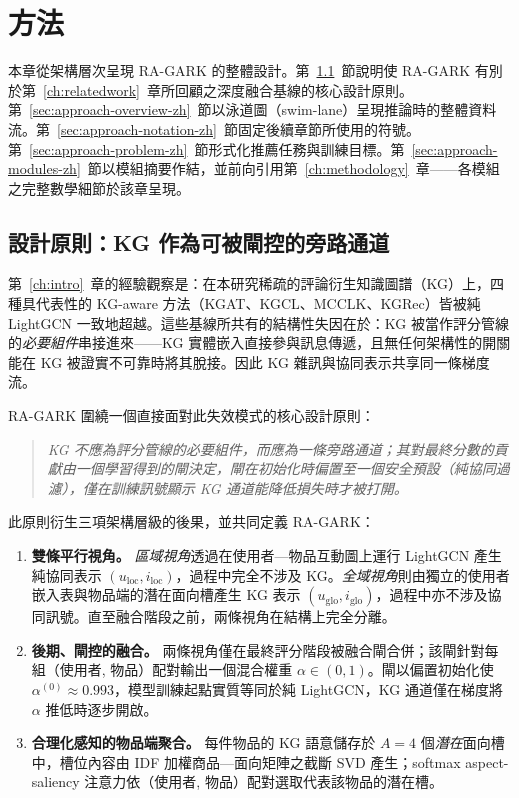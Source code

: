 \chapter{方法}
\label{ch:architecture-zh}

本章從架構層次呈現 RA-GARK 的整體設計。第~\ref{sec:approach-principle-zh}~節說明使 RA-GARK 有別於第~\ref{ch:relatedwork}~章所回顧之深度融合基線的核心設計原則。第~\ref{sec:approach-overview-zh}~節以泳道圖（swim-lane）呈現推論時的整體資料流。第~\ref{sec:approach-notation-zh}~節固定後續章節所使用的符號。第~\ref{sec:approach-problem-zh}~節形式化推薦任務與訓練目標。第~\ref{sec:approach-modules-zh}~節以模組摘要作結，並前向引用第~\ref{ch:methodology}~章——各模組之完整數學細節於該章呈現。

\section{設計原則：KG 作為可被閘控的旁路通道}
\label{sec:approach-principle-zh}

第~\ref{ch:intro}~章的經驗觀察是：在本研究稀疏的評論衍生知識圖譜（KG）上，四種具代表性的 KG-aware 方法（KGAT、KGCL、MCCLK、KGRec）皆被純 LightGCN 一致地超越。這些基線所共有的結構性失因在於：KG 被當作評分管線的\emph{必要組件}串接進來——KG 實體嵌入直接參與訊息傳遞，且無任何架構性的開關能在 KG 被證實不可靠時將其脫接。因此 KG 雜訊與協同表示共享同一條梯度流。

RA-GARK 圍繞一個直接面對此失效模式的核心設計原則：

\begin{quote}
\emph{KG 不應為評分管線的必要組件，而應為一條旁路通道；其對最終分數的貢獻由一個學習得到的閘決定，閘在初始化時偏置至一個安全預設（純協同過濾），僅在訓練訊號顯示 KG 通道能降低損失時才被打開。}
\end{quote}

此原則衍生三項架構層級的後果，並共同定義 RA-GARK：

\begin{enumerate}
  \item \textbf{雙條平行視角。} \emph{區域視角}透過在使用者—物品互動圖上運行 LightGCN 產生純協同表示 $(u_{\mathrm{loc}}, i_{\mathrm{loc}})$，過程中完全不涉及 KG。\emph{全域視角}則由獨立的使用者嵌入表與物品端的潛在面向槽產生 KG 表示 $(u_{\mathrm{glo}}, i_{\mathrm{glo}})$，過程中亦不涉及協同訊號。直至融合階段之前，兩條視角在結構上完全分離。
  \item \textbf{後期、閘控的融合。} 兩條視角僅在最終評分階段被融合閘合併；該閘針對每組（使用者, 物品）配對輸出一個混合權重 $\alpha \in (0, 1)$。閘以偏置初始化使 $\alpha^{(0)} \approx 0.993$，模型訓練起點實質等同於純 LightGCN，KG 通道僅在梯度將 $\alpha$ 推低時逐步開啟。
  \item \textbf{合理化感知的物品端聚合。} 每件物品的 KG 語意儲存於 $A=4$ 個\emph{潛在}面向槽中，槽位內容由 IDF 加權商品—面向矩陣之截斷 SVD 產生；softmax aspect-saliency 注意力依（使用者, 物品）配對選取代表該物品的潛在槽。
\end{enumerate}


